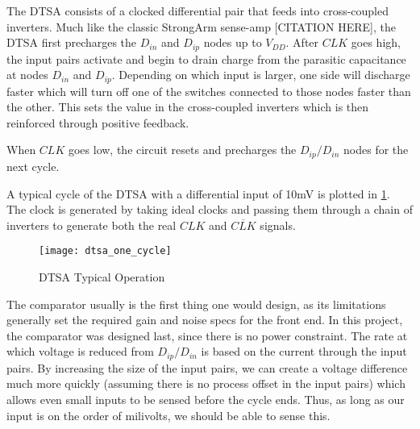 \clearpage
The DTSA consists of a clocked differential pair that feeds into cross-coupled inverters. Much like the classic StrongArm sense-amp [CITATION HERE], the DTSA first precharges the $D_{in}$ and $D_{ip}$ nodes up to $V_{DD}$. After $CLK$ goes high, the input pairs activate and begin to drain charge from the parasitic capacitance at nodes $D_{in}$ and $D_{ip}$. Depending on which input is larger, one side will discharge faster which will turn off one of the switches connected to those nodes faster than the other. This sets the value in the cross-coupled inverters which is then reinforced through positive feedback. 

When $CLK$ goes low, the circuit resets and precharges the $D_{ip}/D_{in}$ nodes for the next cycle.

A typical cycle of the DTSA with a differential input of 10mV is plotted in \ref{fig:dtsa_op}. The clock is generated by taking ideal clocks and passing them through a chain of inverters to generate both the real $CLK$ and $\overline{CLK}$ signals.
\begin{figure}[h]
\centering
\texttt{[image: dtsa\_one\_cycle]}
\caption{DTSA Typical Operation}
\label{fig:dtsa_op}
\end{figure}

The comparator usually is the first thing one would design, as its limitations generally set the required gain and noise specs for the front end. In this project, the comparator was designed last, since there is no power constraint. The rate at which voltage is reduced from $D_{ip}/D_{in}$ is based on the current through the input pairs. By increasing the size of the input pairs, we can create a voltage difference much more quickly (assuming there is no process offset in the input pairs) which allows even small inputs to be sensed before the cycle ends. Thus, as long as our input is on the order of milivolts, we should be able to sense this.

